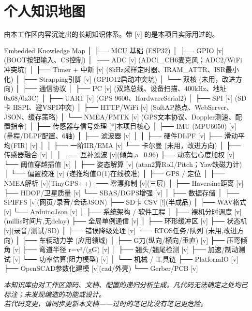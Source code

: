 \documentclass[UTF8,11pt,a4paper]{ctexart}
\begin{document}
\section{个人知识地图}
\noindent 由本工作区内容沉淀出的长期知识体系。带 [v] 的是本项目实际用过的。
\begin{ascii}
Embedded Knowledge Map
│
├── MCU 基础 (ESP32)
│   ├── GPIO [v]           (BOOT按钮输入、CS控制)
│   ├── ADC [v]            (ADC1_CH6麦克风；ADC2/WiFi冲突坑)
│   ├── Timer + 中断 [v]    (8kHz采样定时器、IRAM_ATTR、ISR最小化)
│   ├── Strapping引脚 [v]   (GPIO12启动冲突坑)
│   └── 双核 (未用，改进方向)
│
├── 通信协议
│   ├── I²C [v]            (双路总线、设备扫描、400kHz、地址0x68/0x3C)
│   ├── UART [v]           (GPS 9600、HardwareSerial2)
│   ├── SPI [v]            (SD卡 HSPI、避VSPI冲突)
│   ├── HTTP/WiFi [v]      (SoftAP热点、WebServer、JSON、缓存策略)
│   └── NMEA/PMTK [v]      (GPS文本协议、Doppler测速、配置指令)
│
├── 传感器与信号处理 [*]本项目核心
│   ├── IMU (MPU6050) [v]  (量程/DLPF配置、6轴)
│   ├── 滤波器 [v]
│   │   ├── 硬件DLPF [v]      ├── 滑动平均(FIR) [v]
│   │   ├── 一阶IIR/EMA [v]   └── 卡尔曼 (未用，改进方向)
│   ├── 传感器融合 [v]
│   │   ├── 互补滤波 [v](倾角,a=0.96)  ├── 动态信心度加权 [v]  └── 阈值穿越插值 [v]
│   ├── 姿态解算 [v]       (atan2算Roll/Pitch；Yaw缺磁力计)
│   └── 偏置校准 [v]       (递推均值O(1)在线校准)
│
├── GPS / 定位
│   ├── NMEA解析 [v](TinyGPS++)   ├── 零漂抑制 [v](三层)
│   ├── Haversine距离 [v]          ├── HDOP/卫星质量 [v]   └── SBAS/DGPS增强 [v]
│
├── 数据存储
│   ├── SPIFFS [v](网页/录音/会话JSON)  ├── SD卡 CSV [!](半成品)
│   ├── WAV格式 [v]                     └── ArduinoJson [v]
│
├── 系统架构 / 软件工程
│   ├── 裸机分时调度 [v](millis时间片,无delay)   ├── 全局单例通信 [v]
│   ├── 环形缓冲区 [v]   ├── 状态机 [v](录音/测试/SD)
│   ├── 错误降级处理 [v] └── RTOS任务/队列 (未用,改进方向)
│
├── 车辆动力学 (应用领域)
│   ├── G力(纵向/横向/垂直) [v]   ├── 压弯倾角 [v]   ├── 弯道半径 r=v²/(gG) [v]
│   ├── 翘头/翘尾检测 [v]          ├── 加速/制动测试 [v]  └── 功率估算(阻力模型) [v]
│
└── 机械 / 工具链
    ├── PlatformIO [v]   ├── OpenSCAD参数化建模 [v](cad/外壳)   └── Gerber/PCB [v]
\end{ascii}

\vspace{8pt}
\begin{center}\small\color{gray}\itshape
本知识库由对工作区源码、文档、配置的递归分析生成。凡代码无法确定之处均已标注；未发现编造的功能或设计。\\
若代码变更，请同步更新本文档——过时的笔记比没有笔记更危险。
\end{center}
\end{document}
